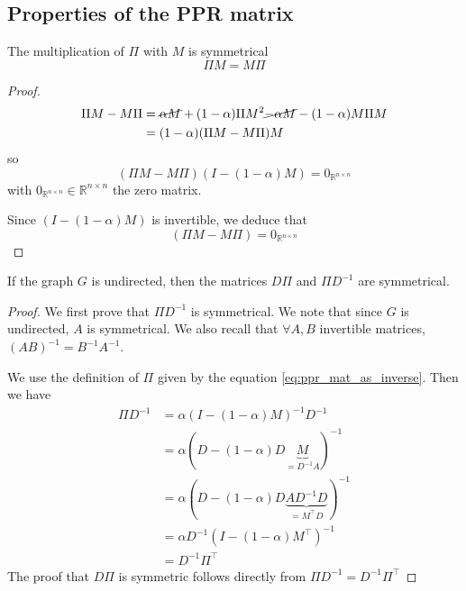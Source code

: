 \subsection{Properties of the PPR matrix}
\begin{theorem} The multiplication of $\Pi$ with $M$ is symmetrical
    \[\Pi M = M \Pi\]
\end{theorem}
\begin{proof}
    \begin{equation*}
    \begin{split}
        \Pi M - M \Pi & = \cancel{\alpha M} + (1-\alpha)\Pi M^2 \cancel{- \alpha M} - (1-\alpha) M \Pi M\\
        & = (1-\alpha)(\Pi M - M \Pi) M
    \end{split}
\end{equation*}
so $$(\Pi M - M \Pi)(I - (1-\alpha)M) = 0_{\mathbb{R}^{n \times n}}$$ with $0_{\mathbb{R}^{n \times n}} \in \mathbb{R}^{n \times n}$ the zero matrix.

Since $(I - (1-\alpha)M)$ is invertible, we deduce that
\[(\Pi M - M \Pi) = 0_{\mathbb{R}^{n \times n}}\]
\end{proof}

\begin{theorem}
    If the graph $G$ is undirected, then the matrices $D\Pi$ and $\Pi D^{-1}$ are symmetrical.
\end{theorem}
\begin{proof}
     We first prove that $\Pi D^{-1}$ is symmetrical. We note that since $G$ is undirected, $A$ is symmetrical. We also recall that $\forall A, B$ invertible matrices, $(AB)^{-1} = B^{-1} A^{-1}$.
     
     We use the definition of $\Pi$ given by the equation \ref{eq:ppr_mat_as_inverse}. Then we have 
    \begin{equation*}
        \begin{split}
            \Pi D^{-1} &= \alpha (I - (1-\alpha) M)^{-1} D^{-1}\\
            &= \alpha (D - (1-\alpha) D \underbrace{M}_{= D^{-1} A})^{-1}\\
            &= \alpha (D - (1-\alpha) D \underbrace{A D^{-1} D}_{=M^\top D})^{-1}\\ 
            &= \alpha D^{-1}(I - (1-\alpha) M^\top)^{-1}\\
            &= D^{-1}\Pi^\top
        \end{split}
    \end{equation*}
    The proof that $D\Pi$ is symmetric follows directly from $\Pi D^{-1} = D^{-1} \Pi^\top$
\end{proof}

